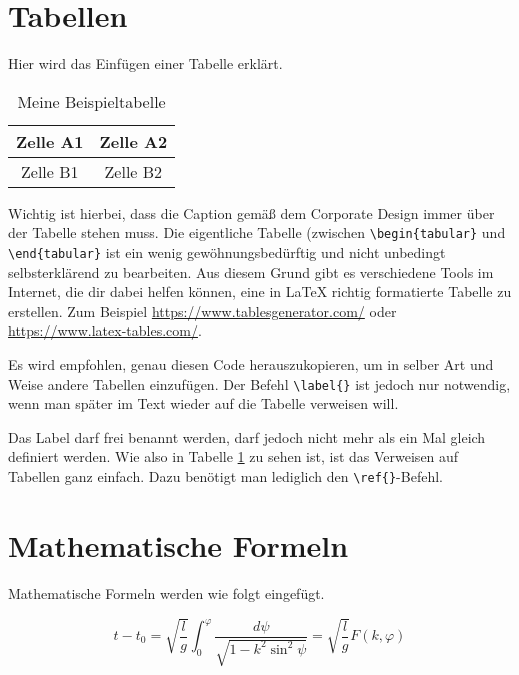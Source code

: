 \section{Tabellen}

Hier wird das Einfügen einer Tabelle erklärt.

\begin{table}[H]
    \centering
    \caption{Meine Beispieltabelle}
    \label{tab:beispiel}
    \begin{tabular}{|c|c|}
        \hline
        Zelle A1 & Zelle A2 \\
        \hline
        Zelle B1 & Zelle B2 \\
        \hline
    \end{tabular}
\end{table}

Wichtig ist hierbei, dass die Caption gemäß dem Corporate Design immer über der Tabelle stehen muss. Die eigentliche Tabelle (zwischen \texttt{\textbackslash{}begin\{tabular\}} und \texttt{\textbackslash{}end\{tabular\}} ist ein wenig gewöhnungsbedürftig und nicht unbedingt selbsterklärend zu bearbeiten. Aus diesem Grund gibt es verschiedene Tools im Internet, die dir dabei helfen können, eine in LaTeX richtig formatierte Tabelle zu erstellen. Zum Beispiel \href{https://www.tablesgenerator.com/}{https://www.tablesgenerator.com/} oder \href{https://www.latex-tables.com/}{https://www.latex-tables.com/}.

Es wird empfohlen, genau diesen Code herauszukopieren, um in selber Art und Weise andere Tabellen einzufügen. Der Befehl \texttt{\textbackslash{}label\{\}} ist jedoch nur notwendig, wenn man später im Text wieder auf die Tabelle verweisen will.

Das Label darf frei benannt werden, darf jedoch nicht mehr als ein Mal gleich definiert werden. Wie also in Tabelle \ref{tab:beispiel} zu sehen ist, ist das Verweisen auf Tabellen ganz einfach. Dazu benötigt man lediglich den \texttt{\textbackslash{}ref\{\}}-Befehl.


\section{Mathematische Formeln}
Mathematische Formeln werden wie folgt eingefügt.

\begin{equation}
t-t_{0}=\sqrt{\frac{l}{g}}\int_{0}^{\varphi}{\frac{d\psi}{\sqrt{1-k^{2}\sin^{2} {\psi}}}} = \sqrt{\frac{l}{g}} F(k,\varphi)
\label{eq:Beispiel}
\end{equation}

